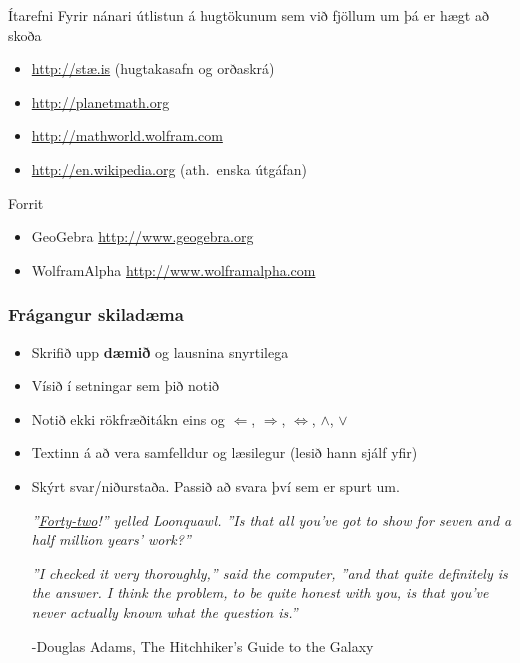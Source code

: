 \documentclass[icelandic,a4paper,12pt]{article}
\begin{document}
\begin{frame}{Ítarefni}
 Fyrir nánari útlistun á hugtökunum sem við fjöllum um þá er hægt að skoða
\begin{itemize}
 \item \href{http://stae.is}{http://stæ.is} (hugtakasafn og orðaskrá)
  \item \href{http://planetmath.org}{http://planetmath.org}
  \item \href{http://mathworld.wolfram.com}{http://mathworld.wolfram.com}
  \item \href{http://en.wikipedia.org}{http://en.wikipedia.org} (ath.~enska útgáfan)
\end{itemize}

\pause
\begin{block}{Forrit}
 \begin{itemize}
  \item GeoGebra \href{http://www.geogebra.org}{http://www.geogebra.org}
  \item WolframAlpha \href{http://www.wolframalpha.com}{http://www.wolframalpha.com}
 \end{itemize}

\end{block}

\end{frame}

 \subsubsection{Frágangur skiladæma}
 \begin{itemize}
 \item Skrifið upp {\bf dæmið} og lausnina snyrtilega
 \pause
 \item Vísið í setningar sem þið notið
 \pause
 \item Notið ekki rökfræðitákn eins og $\Leftarrow$, 
 $\Rightarrow$, $\Leftrightarrow$, $\wedge$, $\vee$
 \pause
 \item Textinn á að vera samfelldur og læsilegur (lesið hann 
 sjálf yfir)
 \pause
 \item Skýrt svar/niðurstaða. Passið að svara því sem er spurt um.
 
 \emph{''\href{https://en.wikipedia.org/wiki/42_(number)}{Forty-two}!'' yelled Loonquawl. ''Is that all you've got to show 
for seven and a half million years' work?''}

\emph{''I checked it very thoroughly,'' said the computer, ''and that 
quite definitely is the answer. I think the problem, to be quite 
honest with you, is that you've never actually known what the 
question is.''} 

\hfill -Douglas Adams, The Hitchhiker's Guide to the Galaxy
 \end{itemize}
\end{document}
